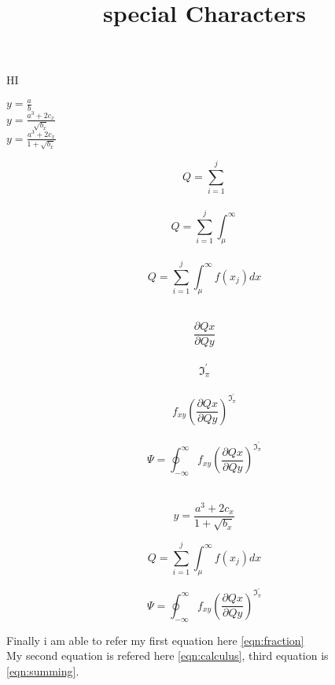 \documentclass{article}
\title{special Characters}
\begin{document}
HI\newline

\begin{center}
\huge$ y=\frac{a}{b}$\\
\vspace{0.5in}
$ y=\frac{a^3+2c_{x}}{\sqrt{b_{x}}} $\\
\vspace{0.5in}
$ y=\frac{a^3+2c_{x}}{1+\sqrt{b_{x}}} $
\vspace{0.5in}
\end{center}
\newpage

\begin{center}
\Huge
$$Q=\sum_{i=1}^{j}$$ \\
$$Q=\sum_{i=1}^{j}\int_{\mu}^{\infty}$$\\
$$ Q=\sum_{i=1}^{j}\int_{\mu}^{\infty}f(x_{j})dx $$ \\
\end{center}
\newpage


\begin{center}
\Huge
$$\frac{\partial{Qx}}{\partial{Qy}}$$ \\
$${\Im_{\pi}^ \prime} $$ \\
$$f_{xy}({\frac{\partial Qx}{\partial Qy}})^{\Im_{\pi}^ \prime} $$ \\
$$ \Psi = \oint_{- \infty}^{\infty}f_{xy}({\frac{\partial
Qx}{\partial Qy}})^{\Im_{\pi}^ \prime} $$ \\
\end{center}
\newpage


	
\begin{center}
{\large

\begin{equation}\label{eqn:fraction}
 y=\frac{a^3+2c_{x}}{1+\sqrt{b_{x}}}  
\end{equation}


\vspace{0.2in}
\begin{equation}\label{eqn:calculus}
 Q=\sum_{i=1}^{j}\int_{\mu}^{\infty}f(x_{j})dx 
\end{equation}

\vspace{0.2in}

\begin{equation}\label{eqn:summing}
\Psi = \oint_{- \infty}^{\infty}f_{xy}({\frac{\partial Qx}{\partial Qy}})^{\Im_{\pi}^ \prime}
\end{equation}

}
\end{center}
\vspace{2in}
\Huge
Finally i am able to refer my first equation here \ref{eqn:fraction} \\
My second equation is refered here \ref{eqn:calculus}, third equation is \ref{eqn:summing}.
\end{document}
